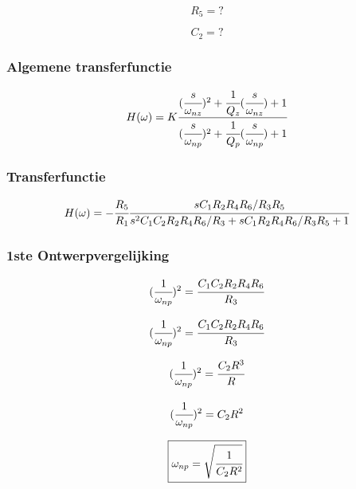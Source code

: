 \documentclass[]{article}
\begin{document}
\begin{equation*}
R_{5} = ?
\end{equation*}

\begin{equation*}
C_{2} = ?
\end{equation*}



\subsubsection*{Algemene transferfunctie}
\begin{equation*}
H(\omega) = K 
\cfrac
{(\cfrac{s}{\omega_{nz}})^{2}+\cfrac{1}{Q_{z}}(\cfrac{s}{\omega_{nz}})+1}
{(\cfrac{s}{\omega_{np}})^{2}+\cfrac{1}{Q_{p}}(\cfrac{s}{\omega_{np}})+1}
\end{equation*}

\subsubsection*{Transferfunctie}
\begin{equation*}
H(\omega) = -	\cfrac{R_{5}}{R_{1}} 
				\cfrac{sC_{1}R_{2}R_{4}R_{6}/R_{3}R_{5}}
				{s^{2}C_{1}C_{2}R_{2}R_{4}R_{6}/R_{3}+sC_{1}R_{2}R_{4}R_{6}/R_{3}R_{5}+1}
\end{equation*}

\subsubsection*{1ste Ontwerpvergelijking}
\begin{equation*}
(\cfrac{1}{\omega_{np}})^{2} = \cfrac{C_{1}C_{2}R_{2}R_{4}R_{6}}{R_{3}} 
\end{equation*}

\begin{equation*}
(\cfrac{1}{\omega_{np}})^{2} = \cfrac{C_{1}C_{2}R_{2}R_{4}R_{6}}{R_{3}} 
\end{equation*}

\begin{equation*}
(\cfrac{1}{\omega_{np}})^{2} = \cfrac{C_{2}R^{3}}{R} 
\end{equation*}

\begin{equation*}
(\cfrac{1}{\omega_{np}})^{2} = {C_{2}R^{2}} 
\end{equation*}

\begin{equation} \label{eq:omega}
\boxed{\omega_{np} = \sqrt{\cfrac{1}{C_{2}R^{2}}}}
\end{equation}
\end{document}
